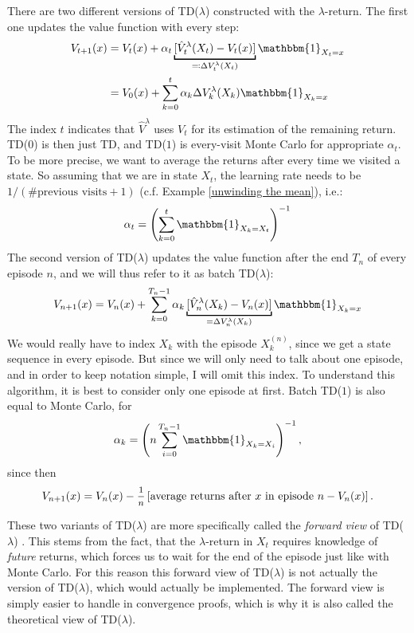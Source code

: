 There are two different versions of TD(\(\lambda\)) constructed with the \(\lambda\)-return. 
The first one updates the value function with every step:
\begin{align}
	V_{t+1}(x)&= V_t(x) + \alpha_t \underbracket[1pt]{[\hat{V}_t^\lambda(X_t)-V_t(x)]}_{
		\eqqcolon \Delta V^\lambda_t(X_t)
	}\mathbbm{1}_{X_t=x}
	\label{forward TD algorithm} \\
	&=V_0(x) + \sum_{k=0}^t \alpha_k\Delta V^\lambda_k(X_k) \mathbbm{1}_{X_k=x}\label{forward TD expanded}
\end{align}
The index \(t\) indicates that \(\hat{V}^\lambda\) uses \(V_t\) for its estimation of the remaining return. TD(\(0\)) is then just TD, and TD(\(1\)) is every-visit Monte Carlo for appropriate \(\alpha_t\). To be more precise, we want to average the returns after every time we visited a state. So assuming that we are in state \(X_t\), the learning rate needs to be \(1/(\#\text{previous visits}+1)\) (c.f. Example \ref{unwinding the mean}), i.e.:
\[
	\alpha_t=\left(\sum_{k=0}^{t}\mathbbm{1}_{X_k=X_t}\right)^{-1}
\]
The second version of TD(\(\lambda\)) updates the value function after the end \(T_n\) of every episode \(n\), and we will thus refer to it as batch TD(\(\lambda\)):
\begin{align}\label{forward batch TD}
	V_{n+1}(x)=V_n(x)+\sum_{k=0}^{T_n-1}\alpha_k \underbracket[1pt]{[\hat{V}_n^\lambda(X_{k})-V_n(x)]}_{=\Delta V_n^\lambda(X_{k})}\mathbbm{1}_{X_{k}=x}
\end{align}
We would really have to index \(X_k\) with the episode \(X_k^{(n)}\), since we get a state sequence in every episode. But since we will only need to talk about one episode, and in order to keep notation simple, I will omit this index. To understand this algorithm, it is best to consider only one episode at first. Batch TD(\(1\)) is also equal to Monte Carlo, for
\begin{align}\label{batch TD(1) learning rate}
	\alpha_k= \left(n\sum_{i=0}^{T_n-1}\mathbbm{1}_{X_{k}=X_i} \right)^{-1},
\end{align}
since then
\[
	V_{n+1}(x)=V_n(x)- \mfrac{1}{n}\left[\text{average returns after \(x\) in episode }n - V_n(x)\right].
\]

These two variants of TD(\(\lambda\)) are more specifically called the \emph{forward view} of TD(\(\lambda\)) \parencite{suttonReinforcementLearningIntroduction1998}. This stems from the fact, that the \(\lambda\)-return in \(X_t\) requires knowledge of \emph{future} returns, which forces us to wait for the end of the episode just like with Monte Carlo. For this reason this forward view of TD(\(\lambda\)) is not actually the version of TD(\(\lambda\)), which would actually be implemented. The forward view is simply easier to handle in convergence proofs, which is why it is also called the theoretical view of TD(\(\lambda\)). 

